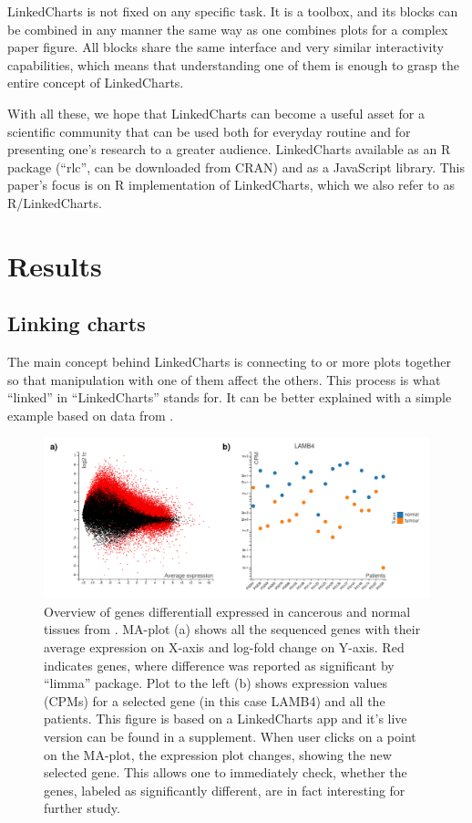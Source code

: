\documentclass[twocolumn,10pt]{article}
\begin{document}
LinkedCharts is not fixed on any specific task. It is a toolbox, and its blocks can be combined in any manner the same way as one combines plots for a complex paper figure. All blocks share the same interface and very similar interactivity capabilities, which means that understanding one of them is enough to grasp the entire concept of LinkedCharts.

With all these, we hope that LinkedCharts can become a useful asset for a scientific community that can be used both for everyday routine and for presenting one's research to a greater audience. LinkedCharts available as an R package (``rlc'', can be downloaded from CRAN) and as a JavaScript library. This paper's focus is on R implementation of LinkedCharts, which we also refer to as R/LinkedCharts. 

\section{Results}
\subsection{Linking charts}

The main concept behind LinkedCharts is connecting to or more plots together so that manipulation with one of them affect the others. This process is what ``linked'' in ``LinkedCharts'' stands for. It can be better explained with a simple example based on data from \citet{conway_2015}.

\begin{figure}
	\includegraphics[width=\textwidth]{FigD/figD.png}
	\caption{Overview of genes differentiall expressed in cancerous and normal tissues from \citet{conway_2015}. MA-plot (a) shows all the sequenced genes with their average expression on X-axis and log-fold change on Y-axis. Red indicates genes, where difference was reported as significant by ``limma'' package. Plot to the left (b) shows expression values (CPMs) for a selected gene (in this case LAMB4) and all the patients. This figure is based on a LinkedCharts app and it's live version can be found in a supplement. When user clicks on a point on the MA-plot, the expression plot changes, showing the new selected gene. This allows one to immediately check, whether the genes, labeled as significantly different, are in fact interesting for further study.}
	\label{FigD}
\end{figure}
\end{document}
